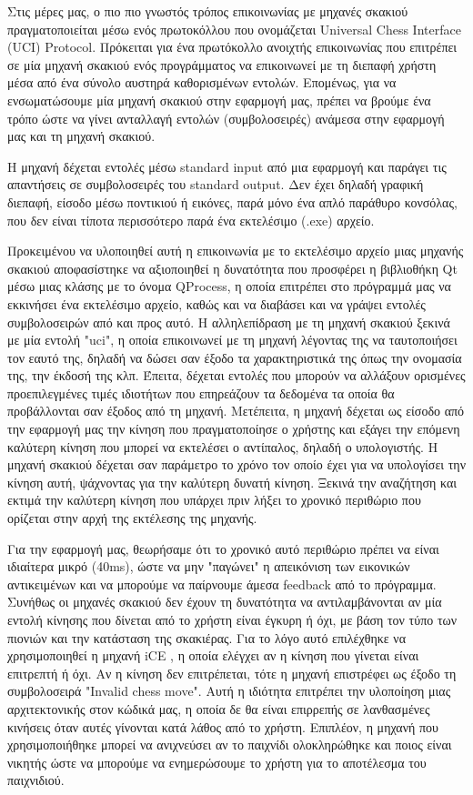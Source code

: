 Στις μέρες μας, ο πιο πιο γνωστός τρόπος επικοινωνίας με μηχανές σκακιού πραγματοποιείται μέσω ενός πρωτοκόλλου που ονομάζεται Universal Chess Interface (UCI) Protocol. Πρόκειται για ένα πρωτόκολλο ανοιχτής επικοινωνίας που επιτρέπει σε μία μηχανή σκακιού ενός προγράμματος να επικοινωνεί με τη διεπαφή χρήστη μέσα από ένα σύνολο αυστηρά καθορισμένων εντολών. Επομένως, για να ενσωματώσουμε μία μηχανή σκακιού στην εφαρμογή μας, πρέπει να βρούμε ένα τρόπο ώστε να γίνει ανταλλαγή εντολών (συμβολοσειρές) ανάμεσα στην εφαρμογή μας και τη μηχανή σκακιού. 


Η μηχανή δέχεται εντολές μέσω standard input από μια εφαρμογή και παράγει τις απαντήσεις σε συμβολοσειρές του standard output. Δεν έχει δηλαδή γραφική διεπαφή, είσοδο μέσω ποντικιού ή εικόνες, παρά μόνο ένα απλό παράθυρο κονσόλας, που δεν είναι τίποτα περισσότερο παρά ένα εκτελέσιμο (.exe) αρχείο. 

Προκειμένου να υλοποιηθεί αυτή η επικοινωνία με το εκτελέσιμο αρχείο μιας μηχανής σκακιού αποφασίστηκε να αξιοποιηθεί η δυνατότητα που προσφέρει η βιβλιοθήκη Qt μέσω μιας κλάσης με το όνομα QProcess, η οποία επιτρέπει στο πρόγραμμά μας να εκκινήσει ένα εκτελέσιμο αρχείο, καθώς και να διαβάσει και να γράψει εντολές συμβολοσειρών από και προς αυτό. Η αλληλεπίδραση με τη μηχανή σκακιού ξεκινά με μία εντολή "uci", η οποία επικοινωνεί με τη μηχανή λέγοντας της να ταυτοποιήσει τον εαυτό της, δηλαδή να δώσει σαν έξοδο τα χαρακτηριστικά της όπως την ονομασία της, την έκδοσή της κλπ.  Έπειτα, δέχεται εντολές που μπορούν να αλλάξουν ορισμένες προεπιλεγμένες τιμές ιδιοτήτων που επηρεάζουν τα δεδομένα τα οποία θα προβάλλονται σαν έξοδος από τη μηχανή. Μετέπειτα, η μηχανή δέχεται ως είσοδο από την εφαρμογή μας την κίνηση που πραγματοποίησε ο χρήστης και εξάγει την επόμενη καλύτερη κίνηση που μπορεί να εκτελέσει ο αντίπαλος, δηλαδή ο υπολογιστής.
Η μηχανή σκακιού δέχεται σαν παράμετρο το χρόνο τον οποίο έχει για να υπολογίσει την κίνηση αυτή, ψάχνοντας για την καλύτερη δυνατή κίνηση. Ξεκινά την αναζήτηση και εκτιμά την καλύτερη κίνηση που υπάρχει πριν λήξει το χρονικό περιθώριο που ορίζεται στην αρχή της εκτέλεσης της μηχανής. 

Για την εφαρμογή μας, θεωρήσαμε ότι το χρονικό αυτό περιθώριο πρέπει να είναι ιδιαίτερα μικρό (40ms), ώστε να μην "παγώνει" η απεικόνιση των εικονικών αντικειμένων και να μπορούμε να παίρνουμε άμεσα feedback από το πρόγραμμα. Συνήθως οι μηχανές σκακιού δεν έχουν τη δυνατότητα να αντιλαμβάνονται αν μία εντολή κίνησης που δίνεται από το χρήστη είναι έγκυρη ή όχι, με βάση τον τύπο των πιονιών και την κατάσταση της σκακιέρας. Για το λόγο αυτό επιλέχθηκε να χρησιμοποιηθεί η μηχανή iCE \cite{ice}, η οποία ελέγχει αν η κίνηση που γίνεται είναι επιτρεπτή ή όχι. Αν η κίνηση δεν επιτρέπεται, τότε η μηχανή επιστρέφει ως έξοδο τη συμβολοσειρά "Invalid chess move". Αυτή η ιδιότητα επιτρέπει την υλοποίηση μιας αρχιτεκτονικής στον κώδικά μας, η οποία δε θα είναι επιρρεπής σε λανθασμένες κινήσεις όταν αυτές γίνονται κατά λάθος από το χρήστη. Επιπλέον, η μηχανή που χρησιμοποιήθηκε μπορεί να ανιχνεύσει αν το παιχνίδι ολοκληρώθηκε και ποιος είναι νικητής ώστε να μπορούμε να ενημερώσουμε το χρήστη για το αποτέλεσμα του παιχνιδιού. 

